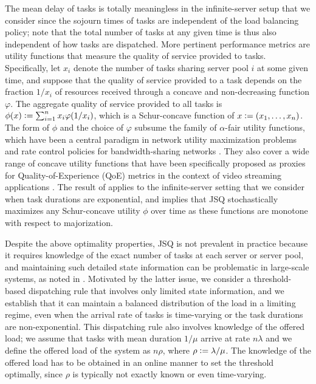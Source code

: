 \documentclass[a4paper, 12pt]{article}
\theoremstyle{definition}
\newcommand{\defeq}{\vcentcolon=}
\begin{document}
The mean delay of tasks is totally meaningless in the infinite-server setup that we consider since the sojourn times of tasks are independent of the load balancing policy; note that the total number of tasks at any given time is thus also independent of how tasks are dispatched. More pertinent performance metrics are utility functions that measure the quality of service provided to tasks. Specifically, let $x_i$ denote the number of tasks sharing server pool $i$ at some given time, and suppose that the quality of service provided to a task depends on the fraction $1 / x_i$ of resources received through a concave and non-decreasing function $\varphi$. The aggregate quality of service provided to all tasks is $\phi(x) \defeq \sum_{i = 1}^n x_i \varphi(1 / x_i)$, which is a Schur-concave function of $x \defeq (x_1, \dots, x_n)$. The form of $\phi$ and the choice of $\varphi$ subsume the family of $\alpha$-fair utility functions, which have been a central paradigm in network utility maximization problems and rate control policies for bandwidth-sharing networks \cite{mo2000fair,srikant2013communication}. They also cover a wide range of concave utility functions that have been specifically proposed as proxies for Quality-of-Experience (QoE) metrics in the context of video streaming applications \cite{hu2012qoe,joseph2015optimal}. The result of \cite{menich1991optimality,sparaggis1993extremal} applies to the infinite-server setting that we consider when task durations are exponential, and implies that JSQ stochastically maximizes any Schur-concave utility $\phi$ over time as these functions are monotone with respect to majorization.

Despite the above optimality properties, JSQ is not prevalent in practice because it requires knowledge of the exact number of tasks at each server or server pool, and maintaining such detailed state information can be problematic in large-scale systems, as noted in \cite{lu2011join}. Motivated by the latter issue, we consider a threshold-based dispatching rule that involves only limited state information, and we establish that it can maintain a balanced distribution of the load in a limiting regime, even when the arrival rate of tasks is time-varying or the task durations are non-exponential. This dispatching rule also involves knowledge of the offered load; we assume that tasks with mean duration $1 / \mu$ arrive at rate $n \lambda$ and we define the offered load of the system as $n \rho$, where $\rho \defeq \lambda / \mu$. The knowledge of the offered load has to be obtained in an online manner to set the threshold optimally, since $\rho$ is typically not exactly known or even time-varying.
\end{document}

